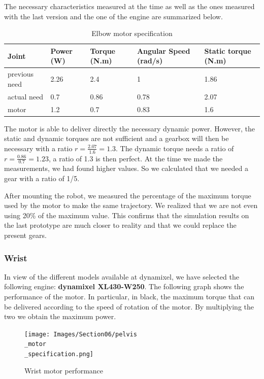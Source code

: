 \bigbreak
The necessary characteristics measured at the time as well as the ones measured with the last version and the one of the engine are summarized below.
\begin{table}[ht]
    \centering
    \begin{tabular}{|p{1.5cm} | p{2cm} | p{2.5cm}| p{2.7cm} | p{2.7cm} |} 
        \hline
        \textbf{Joint}& \textbf{Power (W)} & \textbf{Torque (N.m)} & \textbf{Angular Speed (rad/s)} & \textbf{Static torque (N.m)}\\ [0.3ex]
        \hline
        previous need & 2.26 & 2.4 & 1 & 1.86 \\ 
        \hline
        actual need & 0.7 & 0.86 & 0.78 & 2.07 \\ 
        \hline
        motor & 1.2 & 0.7 & 0.83 & 1.6\\ 
        \hline
    \end{tabular}
    \caption{Elbow motor specification}
\end{table}
\FloatBarrier
The motor is able to deliver directly the necessary dynamic power. However, the static and dynamic torques are not sufficient and a gearbox will then be necessary with a ratio $r=\frac{2.07}{1.6}=1.3$. The dynamic torque needs a ratio of $r=\frac{0.86}{0.7}=1.23$, a ratio of 1.3 is then perfect. At the time we made the measurements, we had found higher values. So we calculated that we needed a gear with a ratio of 1/5.

\bigbreak
After mounting the robot, we measured the percentage of the maximum torque used by the motor to make the same trajectory. We realized that we are not even using 20\% of the maximum value. This confirms that the simulation results on the last prototype are much closer to reality and that we could replace the present gears.

\subsubsection{Wrist}

In view of the different models available at dynamixel, we have selected the following engine: \textbf{dynamixel XL430-W250}. The following graph shows the performance of the motor. In particular, in black, the maximum torque that can be delivered according to the speed of rotation of the motor. By multiplying the two we obtain the maximum power.
\begin{figure}[ht]
    \centering
    \texttt{[image: Images/Section06/pelvis\\\_motor\\\_specification.png]}
    \caption{Wrist motor performance}
    \label{fig:WristMotor}
\end{figure}
\FloatBarrier

